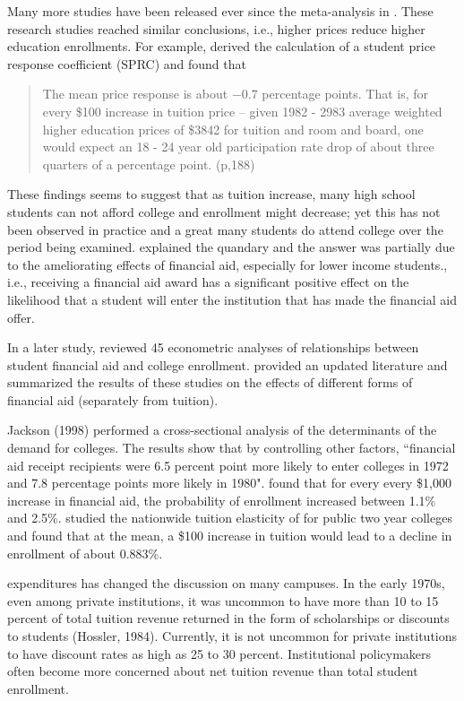 \documentclass[12pt,english]{report}
\begin{document}
Many more studies have been released ever since the meta-analysis in
\citep{Leslie1987}. These research studies reached similar conclusions, i.e.,
higher prices reduce higher education enrollments.  For
example,\citet{Leslie1987} derived the calculation of a student price response
coefficient (SPRC) and found that
\begin{quote} 
The mean price response is about $-0.7$ percentage points. That is, for every
\$100 increase in tuition price -- given 1982 - 2983 average weighted higher
education prices of \$3842 for tuition and room and board, one would expect an
18 - 24 year old participation rate drop of about three quarters of a
percentage point. (p,188)
\end{quote} 

These findings seems to suggest that as tuition increase, many high school
students can not afford college and enrollment might decrease; yet this has not
been observed in practice and a great many students do attend college over the
period being examined. \citet{Leslie1987} explained the quandary and the answer
was partially due to the ameliorating effects of financial aid, especially for
lower income students., i.e., receiving a financial aid award has a significant
positive effect on the likelihood that a student will enter the institution
that has made the financial aid offer.

In a later study, \citet{Leslie1988} reviewed 45 econometric analyses of
relationships between student financial aid and college enrollment.
\citet{Heller1997} provided an updated literature and summarized the results of
these studies on the effects of different forms of financial aid (separately
from tuition).

Jackson (1998) performed a cross-sectional analysis of the determinants of the
demand for colleges.  The results show that by controlling other factors,
``financial aid receipt recipients were 6.5 percent point more likely to enter
colleges in 1972 and 7.8 percentage points more likely in 1980".
\citet{Braunstein1999} found that for every every \$1,000 increase in financial
aid, the probability  of  enrollment increased between 1.1\% and 2.5\%.
\citet{Crouse2015} studied the nationwide tuition elasticity of for public two
year colleges and found that at the mean, a \$100 increase in tuition would
lead to a decline in enrollment of about 0.883\%.

expenditures has changed the discussion on many campuses. In the early 1970s,
even among private institutions, it was uncommon to have more than 10 to 15
percent of total tuition revenue returned in the form of scholarships or
discounts to students (Hossler, 1984). Currently, it is not uncommon for
private institutions to have discount rates as high as 25 to 30 percent.
Institutional policymakers often become more concerned about net tuition
revenue than total student enrollment.
\end{document}
